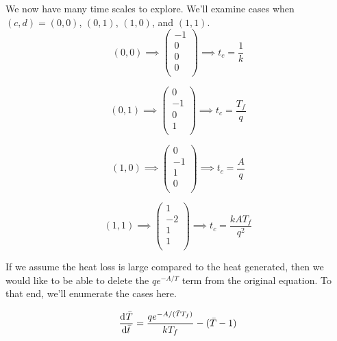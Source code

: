 \documentclass[12pt]{article}
\begin{document}
\begin{enumerate}
  We now have many time scales to explore. We'll examine cases when
  $(c,d)=(0,0)$, $(0,1)$, $(1,0)$, and $(1,1)$.
  \begin{equation*}
      (0,0) \implies
      \begin{pmatrix}
        -1 \\ 0 \\ 0 \\ 0 \\
      \end{pmatrix} \implies t_c =\frac{1}{k}
  \end{equation*}

  \begin{equation*}
      (0,1) \implies
      \begin{pmatrix}
        0 \\ -1 \\ 0 \\ 1 \\
      \end{pmatrix} \implies t_c =\frac{T_f}{q}
  \end{equation*}

  \begin{equation*}
      (1,0) \implies
      \begin{pmatrix}
        0 \\ -1 \\ 1 \\ 0 \\
      \end{pmatrix} \implies t_c =\frac{A}{q}
  \end{equation*}

  \begin{equation*}
      (1,1) \implies
      \begin{pmatrix}
        1 \\ -2 \\ 1 \\ 1 \\
      \end{pmatrix} \implies t_c =\frac{kAT_f}{q^2}
  \end{equation*}

  If we assume the heat loss is large compared to the heat generated, then we
  would like to be able to delete the $qe^{-A/T}$ term from the original
  equation. To that end, we'll enumerate the cases here.

  \begin{equation}
    \label{eq:case-0-0}
    \frac{\mathrm{d}^{} {\bar{T}}}{\mathrm{d}{\bar{t}}^{}} =
    \frac{qe^{-A/(\bar{T}T_f)}}{kT_f} - (\bar{T}-1)
  \end{equation}


\end{enumerate}
\end{document}
